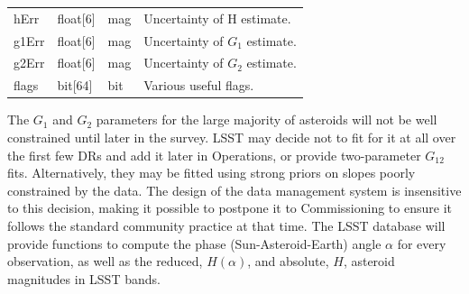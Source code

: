 \begin{center}
\begin{longtable}{p{3cm}p{2cm}p{2cm}p{5cm}}
hErr & float[6] & mag & Uncertainty of H estimate.\\

g1Err & float[6] & mag & Uncertainty of $G_1$ estimate. \\

g2Err & float[6] & mag & Uncertainty of $G_2$ estimate. \\

flags & bit[64] & bit & Various useful flags. \\ \hline

\end{longtable}
\end{center}

The $G_1$ and $G_2$ parameters for the large majority of asteroids will not be well constrained until later in the survey. LSST may decide not to fit for it at all over the first few DRs and add it later in Operations, or provide two-parameter $G_{12}$ fits. Alternatively, they may be fitted using strong priors on slopes poorly constrained by the data. The design of the data management system is insensitive to this decision, making it possible to postpone it to Commissioning to ensure it follows the standard community practice at that time.
The LSST database will provide functions to compute the phase (Sun-Asteroid-Earth) angle $\alpha$ for every observation, as well as the reduced, $H(\alpha)$, and absolute, $H$, asteroid magnitudes in LSST bands.
